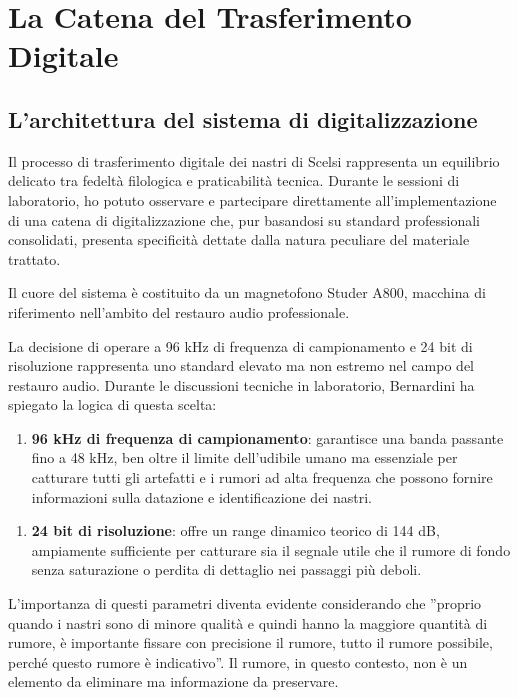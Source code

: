 
\section{La Catena del Trasferimento Digitale}
\subsection{L'architettura del sistema di digitalizzazione}
Il processo di trasferimento digitale dei nastri di Scelsi rappresenta un equilibrio delicato tra fedeltà filologica e praticabilità tecnica. Durante le sessioni di laboratorio, ho potuto osservare e partecipare direttamente all'implementazione di una catena di digitalizzazione che, pur basandosi su standard professionali consolidati, presenta specificità dettate dalla natura peculiare del materiale trattato.

Il cuore del sistema è costituito da un magnetofono Studer A800, macchina di riferimento nell'ambito del restauro audio professionale.

La decisione di operare a 96 kHz di frequenza di campionamento e 24 bit di risoluzione rappresenta uno standard elevato ma non estremo nel campo del restauro audio\cite[p. 172]{pro:scelsitapes2007}. Durante le discussioni tecniche in laboratorio, Bernardini ha spiegato la logica di questa scelta:

\begin{enumerate}
    \item \textbf{96 kHz di frequenza di campionamento}: garantisce una banda passante fino a 48 kHz, ben oltre il limite dell'udibile umano ma essenziale per catturare tutti gli artefatti e i rumori ad alta frequenza che possono fornire informazioni sulla datazione e identificazione dei nastri.
\end{enumerate}

\begin{enumerate}
    \item \textbf{24 bit di risoluzione}: offre un range dinamico teorico di 144 dB, ampiamente sufficiente per catturare sia il segnale utile che il rumore di fondo senza saturazione o perdita di dettaglio nei passaggi più deboli.
\end{enumerate}

L'importanza di questi parametri diventa evidente considerando che ''proprio quando i nastri sono di minore qualità e quindi hanno la maggiore quantità di rumore, è importante fissare con precisione il rumore, tutto il rumore possibile, perché questo rumore è indicativo''. Il rumore, in questo contesto, non è un elemento da eliminare ma informazione da preservare.
